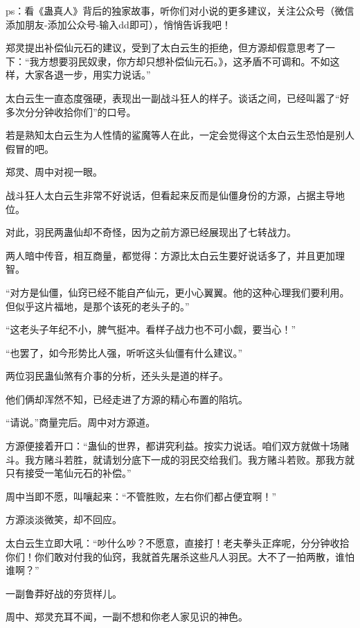 
\begin{this_body}

ps：看《蛊真人》背后的独家故事，听你们对小说的更多建议，关注公众号（微信添加朋友-添加公众号-输入dd即可），悄悄告诉我吧！

郑灵提出补偿仙元石的建议，受到了太白云生的拒绝，但方源却假意思考了一下：“我方想要羽民奴隶，你方却只想补偿仙元石。》，这矛盾不可调和。不如这样，大家各退一步，用实力说话。”

太白云生一直态度强硬，表现出一副战斗狂人的样子。谈话之间，已经叫嚣了“好多次分分钟收拾你们”的口号。

若是熟知太白云生为人性情的鲨魔等人在此，一定会觉得这个太白云生恐怕是别人假冒的吧。

郑灵、周中对视一眼。

战斗狂人太白云生非常不好说话，但看起来反而是仙僵身份的方源，占据主导地位。

对此，羽民两蛊仙却不奇怪，因为之前方源已经展现出了七转战力。

两人暗中传音，相互商量，都觉得：方源比太白云生要好说话多了，并且更加理智。

“对方是仙僵，仙窍已经不能自产仙元，更小心翼翼。他的这种心理我们要利用。但似乎这片福地，是那个该死的老头子的。”

“这老头子年纪不小，脾气挺冲。看样子战力也不可小觑，要当心！”

“也罢了，如今形势比人强，听听这头仙僵有什么建议。”

两位羽民蛊仙煞有介事的分析，还头头是道的样子。

他们俩却浑然不知，已经走进了方源的精心布置的陷坑。

“请说。”商量完后。周中对方源道。

方源便接着开口：“蛊仙的世界，都讲究利益。按实力说话。咱们双方就做十场赌斗。我方赌斗若胜，就请划分底下一成的羽民交给我们。我方赌斗若败。那我方就只有接受一笔仙元石的补偿。”

周中当即不愿，叫嚷起来：“不管胜败，左右你们都占便宜啊！”

方源淡淡微笑，却不回应。

太白云生立即大吼：“吵什么吵？不愿意，直接打！老夫拳头正痒呢，分分钟收拾你们！你们敢对付我的仙窍，我就首先屠杀这些凡人羽民。大不了一拍两散，谁怕谁啊？”

一副鲁莽好战的夯货样儿。

周中、郑灵充耳不闻，一副不想和你老人家见识的神色。


\end{this_body}
